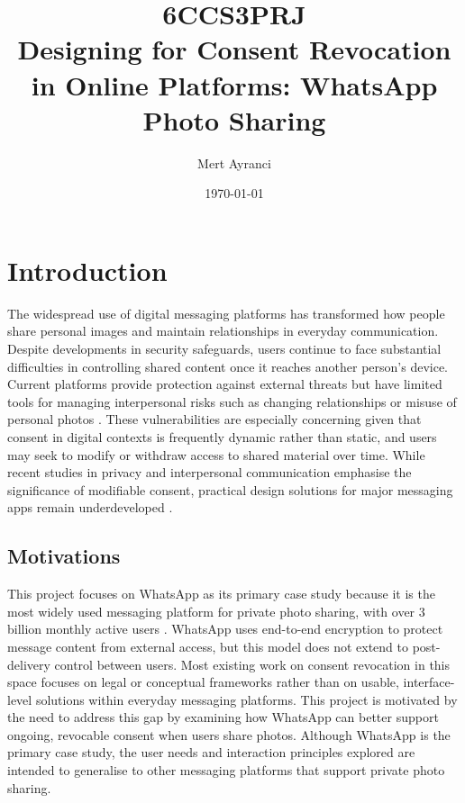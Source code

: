 \documentclass[11pt]{informatics-report}
\title{6CCS3PRJ \\\vspace{0.2cm}Designing for Consent Revocation in Online Platforms: WhatsApp Photo Sharing}
\author{Mert Ayranci}
\date{\today}
\begin{document}
\createFrontMatter
\onehalfspacing
\tableofcontents
\doublespacing


\chapter{Introduction}
The widespread use of digital messaging platforms has transformed how people share personal images and maintain relationships in everyday communication. Despite developments in security safeguards, users continue to face substantial difficulties in controlling shared content once it reaches another person's device. Current platforms provide protection against external threats but have limited tools for managing interpersonal risks such as changing relationships or misuse of personal photos \cite{trepte_2020}. These vulnerabilities are especially concerning given that consent in digital contexts is frequently dynamic rather than static, and users may seek to modify or withdraw access to shared material over time. While recent studies in privacy and interpersonal communication emphasise the significance of modifiable consent, practical design solutions for major messaging apps remain underdeveloped \cite{albesher_2021, im_yes_2021}. 

\section{Motivations} 
This project focuses on WhatsApp as its primary case study because it is the most widely used messaging platform for private photo sharing, with over 3 billion monthly active users \cite{statista_whatsapp_2025}. WhatsApp uses end-to-end encryption to protect message content from external access, but this model does not extend to post-delivery control between users. Most existing work on consent revocation in this space focuses on legal or conceptual frameworks rather than on usable, interface-level solutions within everyday messaging platforms. This project is motivated by the need to address this gap by examining how WhatsApp can better support ongoing, revocable consent when users share photos. Although WhatsApp is the primary case study, the user needs and interaction principles explored are intended to generalise to other messaging platforms that support private photo sharing.
\end{document}
